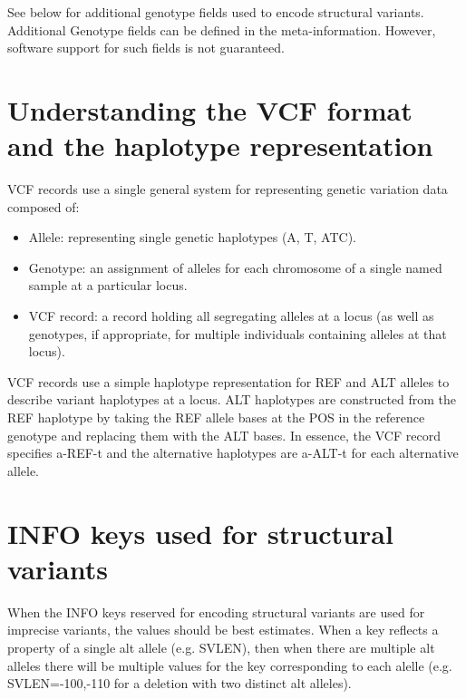 \documentclass[8pt]{article}
\begin{document}
See below for additional genotype fields used to encode structural variants. Additional Genotype fields can be defined in the meta-information. However, software support for such fields is not guaranteed.

\section{Understanding the VCF format and the haplotype representation}
VCF records use a single general system for representing genetic variation data composed of:
\begin{itemize}
  \item Allele: representing single genetic haplotypes (A, T, ATC).
  \item Genotype: an assignment of alleles for each chromosome of a single named sample at a particular locus.
  \item VCF record: a record holding all segregating alleles at a locus (as well as genotypes, if appropriate, for multiple individuals containing alleles at that locus).
\end{itemize}
VCF records use a simple haplotype representation for REF and ALT alleles to describe variant haplotypes at a locus. ALT haplotypes are constructed from the REF haplotype by taking the REF allele bases at the POS in the reference genotype and replacing them with the ALT bases. In essence, the VCF record specifies a-REF-t and the alternative haplotypes are a-ALT-t for each alternative allele.


\section{INFO keys used for structural variants}
When the INFO keys reserved for encoding structural variants are used for imprecise variants, the values should be best estimates. When a key reflects a property of a single alt allele (e.g. SVLEN), then when there are multiple alt alleles there will be multiple values for the key corresponding to each alelle (e.g. SVLEN=-100,-110 for a deletion with two distinct alt alleles).
\end{document}
